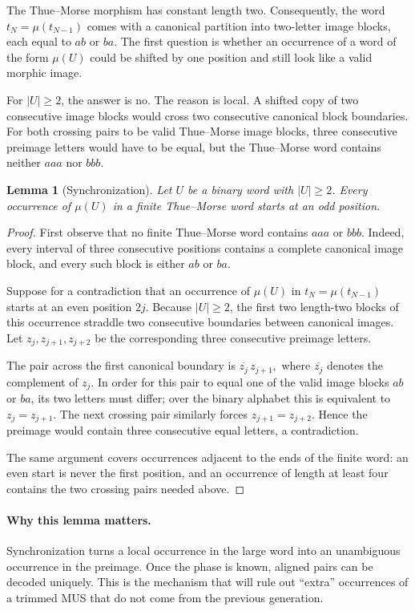 \documentclass[10pt,a4paper]{article}
\newtheorem{lemma}[theorem]{Lemma}
\theoremstyle{definition}\newtheorem{definition}[theorem]{Definition}
\theoremstyle{remark}\newtheorem{remark}[theorem]{Remark}
\begin{document}
The Thue--Morse morphism has constant length two. Consequently, the word $t_N=\mu(t_{N-1})$ comes with a canonical partition into two-letter image blocks, each equal to $ab$ or $ba$. The first question is whether an occurrence of a word of the form $\mu(U)$ could be shifted by one position and still look like a valid morphic image.

For $|U|\ge2$, the answer is no. The reason is local. A shifted copy of two consecutive image blocks would cross two consecutive canonical block boundaries. For both crossing pairs to be valid Thue--Morse image blocks, three consecutive preimage letters would have to be equal, but the Thue--Morse word contains neither $aaa$ nor $bbb$.

\begin{lemma}[Synchronization]
\label{lem:synchronization}
Let $U$ be a binary word with $|U|\ge2$. Every occurrence of $\mu(U)$ in a finite Thue--Morse word starts at an odd position.
\end{lemma}

\begin{proof}
First observe that no finite Thue--Morse word contains $aaa$ or $bbb$. Indeed, every interval of three consecutive positions contains a complete canonical image block, and every such block is either $ab$ or $ba$.

Suppose for a contradiction that an occurrence of $\mu(U)$ in $t_N=\mu(t_{N-1})$ starts at an even position $2j$. Because $|U|\ge2$, the first two length-two blocks of this occurrence straddle two consecutive boundaries between canonical images. Let $z_j,z_{j+1},z_{j+2}$ be the corresponding three consecutive preimage letters.

The pair across the first canonical boundary is
$
\overline{z_j}\,z_{j+1},
$
where $\overline{z_j}$ denotes the complement of $z_j$. In order for this pair to equal one of the valid image blocks $ab$ or $ba$, its two letters must differ; over the binary alphabet this is equivalent to $z_j=z_{j+1}$. The next crossing pair similarly forces $z_{j+1}=z_{j+2}$. Hence the preimage would contain three consecutive equal letters, a contradiction.

The same argument covers occurrences adjacent to the ends of the finite word: an even start is never the first position, and an occurrence of length at least four contains the two crossing pairs needed above.
\end{proof}

\paragraph{Why this lemma matters.}
Synchronization turns a local occurrence in the large word into an unambiguous occurrence in the preimage. Once the phase is known, aligned pairs can be decoded uniquely. This is the mechanism that will rule out ``extra'' occurrences of a trimmed MUS that do not come from the previous generation.
\end{document}

